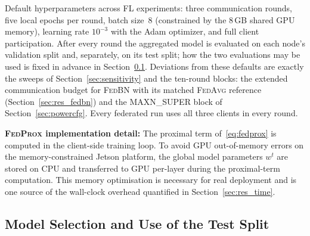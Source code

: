 \documentclass[journal]{IEEEtran}
\newcommand{\fedavg}{\textsc{FedAvg}}
\newcommand{\fedprox}{\textsc{FedProx}}
\newcommand{\fedbn}{\textsc{FedBN}}
\begin{document}
Default hyperparameters across FL experiments: three communication rounds, five local epochs per round, batch size~8 (constrained by the 8\,GB shared GPU memory), learning rate $10^{-3}$ with the Adam optimizer, and full client participation. After every round the aggregated model is evaluated on each node's validation split and, separately, on its test split; how the two evaluations may be used is fixed in advance in Section~\ref{sec:selection}. Deviations from these defaults are exactly the sweeps of Section~\ref{sec:sensitivity} and the ten-round blocks: the extended communication budget for \fedbn{} with its matched \fedavg{} reference (Section~\ref{sec:res_fedbn}) and the MAXN\_SUPER block of Section~\ref{sec:powercfg}. Every federated run uses all three clients in every round.

\textbf{\fedprox{} implementation detail:} The proximal term of~\eqref{eq:fedprox} is computed in the client-side training loop. To avoid GPU out-of-memory errors on the memory-constrained Jetson platform, the global model parameters $w^t$ are stored on CPU and transferred to GPU per-layer during the proximal-term computation. This memory optimisation is necessary for real deployment and is one source of the wall-clock overhead quantified in Section~\ref{sec:res_time}.

\subsection{Model Selection and Use of the Test Split}
\label{sec:selection}
\end{document}
